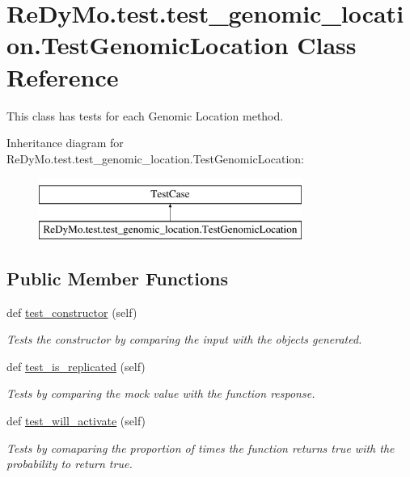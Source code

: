 \hypertarget{classReDyMo_1_1test_1_1test__genomic__location_1_1TestGenomicLocation}{}\section{Re\+Dy\+Mo.\+test.\+test\+\_\+genomic\+\_\+location.\+Test\+Genomic\+Location Class Reference}
\label{classReDyMo_1_1test_1_1test__genomic__location_1_1TestGenomicLocation}


This class has tests for each Genomic Location method.  


Inheritance diagram for Re\+Dy\+Mo.\+test.\+test\+\_\+genomic\+\_\+location.\+Test\+Genomic\+Location\+:\begin{figure}[H]
\begin{center}
\leavevmode
\includegraphics[height=2.000000cm]{classReDyMo_1_1test_1_1test__genomic__location_1_1TestGenomicLocation}
\end{center}
\end{figure}
\subsection*{Public Member Functions}
\begin{DoxyCompactItemize}
\item 
def \mbox{\hyperlink{classReDyMo_1_1test_1_1test__genomic__location_1_1TestGenomicLocation_add11474b7703287f0d310ccb016cfec0}{test\+\_\+constructor}} (self)
\begin{DoxyCompactList}\small\item\em Tests the constructor by comparing the input with the objects generated. \end{DoxyCompactList}\item 
def \mbox{\hyperlink{classReDyMo_1_1test_1_1test__genomic__location_1_1TestGenomicLocation_ada2ce7fa847394f77b6db3f9b1f28445}{test\+\_\+is\+\_\+replicated}} (self)
\begin{DoxyCompactList}\small\item\em Tests by comparing the mock value with the function response. \end{DoxyCompactList}\item 
def \mbox{\hyperlink{classReDyMo_1_1test_1_1test__genomic__location_1_1TestGenomicLocation_a165c828a38385ae5180c0984203207f9}{test\+\_\+will\+\_\+activate}} (self)
\begin{DoxyCompactList}\small\item\em Tests by comaparing the proportion of times the function returns true with the probability to return true. \end{DoxyCompactList}\end{DoxyCompactItemize}


